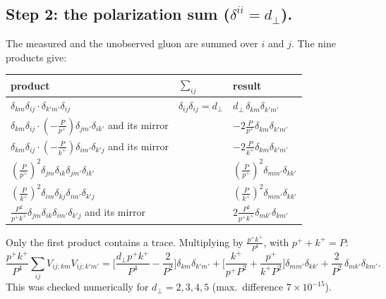 \documentclass[10pt]{article}
\numberwithin{equation}{section}
\begin{document}
\subsection{Step 2: the polarization sum (\texorpdfstring{$\delta^{ii}=d_\perp$}{delta ii = d}).}
The measured and the unobserved gluon are summed over $i$ and $j$. The nine products give:
\begin{center}\small
\begin{tabular}{@{}lll@{}}\toprule
product & $\sum_{ij}$ & result\\\midrule
$\delta_{km}\delta_{ij}\cdot\delta_{k'm'}\delta_{ij}$ & $\delta_{ij}\delta_{ij}=d_\perp$ & $d_\perp\,\delta_{km}\delta_{k'm'}$\\
$\delta_{km}\delta_{ij}\cdot(-\frac{P}{p^+})\delta_{jm'}\delta_{ik'}$ and its mirror & & $-2\frac{P}{p^+}\delta_{km}\delta_{k'm'}$\\
$\delta_{km}\delta_{ij}\cdot(-\frac{P}{k^+})\delta_{im'}\delta_{k'j}$ and its mirror & & $-2\frac{P}{k^+}\delta_{km}\delta_{k'm'}$\\
$(\frac{P}{p^+})^2\delta_{jm}\delta_{ik}\delta_{jm'}\delta_{ik'}$ & & $(\frac{P}{p^+})^2\delta_{mm'}\delta_{kk'}$\\
$(\frac{P}{k^+})^2\delta_{im}\delta_{kj}\delta_{im'}\delta_{k'j}$ & & $(\frac{P}{k^+})^2\delta_{mm'}\delta_{kk'}$\\
$\frac{P^2}{p^+k^+}\delta_{jm}\delta_{ik}\delta_{im'}\delta_{k'j}$ and its mirror & & $2\frac{P^2}{p^+k^+}\delta_{mk'}\delta_{km'}$\\\bottomrule
\end{tabular}
\end{center}
Only the first product contains a trace. Multiplying by $\frac{p^+k^+}{P^4}$, with $p^++k^+=P$:
\begin{equation}
\frac{p^+k^+}{P^4}\sum_{ij}V_{ij;km}V_{ij;k'm'}=\Big[\frac{d_\perp p^+k^+}{P^4}-\frac{2}{P^2}\Big]\delta_{km}\delta_{k'm'}+\Big[\frac{k^+}{p^+P^2}+\frac{p^+}{k^+P^2}\Big]\delta_{mm'}\delta_{kk'}+\frac{2}{P^2}\,\delta_{mk'}\delta_{km'}.
\label{eq:polsum}
\end{equation}
This was checked numerically for $d_\perp=2,3,4,5$ (max.\ difference $7\times10^{-15}$).
\end{document}

